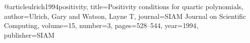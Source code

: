 @article{ulrich1994positivity,
  title={Positivity conditions for quartic polynomials},
  author={Ulrich, Gary and Watson, Layne T},
  journal={SIAM Journal on Scientific Computing},
  volume={15},
  number={3},
  pages={528--544},
  year={1994},
  publisher={SIAM}
}

